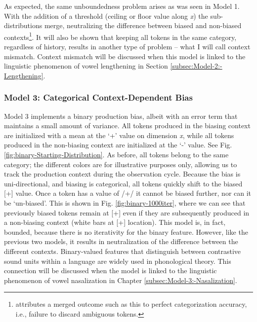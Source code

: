 As expected, the same unboundedness problem arises as was seen in
Model 1. With the addition of a threshold (ceiling or floor value
along \emph{x}) the sub-distributions merge, neutralizing the difference
between biased and non-biased contexts\footnote{\citet{DBLP:journals/corr/Tupper14a} attributes a merged outcome
such as this to perfect categorization accuracy, i.e., failure to
discard ambiguous tokens. }. It will also be shown that keeping all tokens in the same category,
regardless of history, results in another type of problem – what I
will call context mismatch. Context mismatch will be discussed when
this model is linked to the linguistic phenomenon of vowel lengthening
in Section \ref{subsec:Model-2:-Lengthening}. 

\subsubsection{\label{subsec:Model-3:-Categorical}Model 3: Categorical Context-Dependent
Bias}

Model 3 implements a binary production bias, albeit with an error
term that maintains a small amount of variance. All tokens produced
in the biasing context are initialized with a mean at the `+' value
on dimension \emph{x}, while all tokens produced in the non-biasing
context are initialized at the `-' value. See Fig. \ref{fig:binary-Starting-Distribution}.
As before, all tokens belong to the same category; the different colors
are for illustrative purposes only, allowing us to track the production
context during the observation cycle. Because the bias is uni-directional,
and biasing is categorical, all tokens quickly shift to the biased
{[}+{]} value. Once a token has a value of /+/ it cannot be biased
further, nor can it be `un-biased'. This is shown in Fig. \ref{fig:binary-1000iter},
where we can see that previously biased tokens remain at {[}+{]} even
if they are subsequently produced in a non-biasing context (white
bars at {[}+{]} location). This model is, in fact, bounded, because
there is no iterativity for the binary feature. However, like the
previous two models, it results in neutralization of the difference
between the different contexts. Binary-valued features that distinguish
between contrastive sound units within a language are widely used
in phonological theory. This connection will be discussed when the
model is linked to the linguistic phenomenon of vowel nasalization
in Chapter \ref{subsec:Model-3:-Nasalization}.

